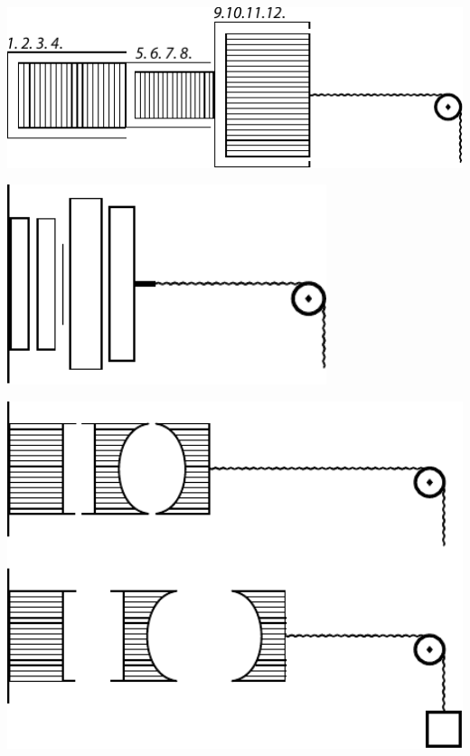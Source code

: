 \pend
\vspace{3em}
\pstart\noindent
\begin{minipage}[t]{0.4\textwidth}
\includegraphics[width=1\textwidth]{gesamttex/edit_VIII,3/images/LH_35_09_16_002-003_d7a.pdf}
\end{minipage}
\hspace*{4mm}
\begin{minipage}[t]{0.26\textwidth}
\includegraphics[width=0.7\textwidth]{gesamttex/edit_VIII,3/images/LH_35_09_16_002-003_d7b.pdf}
\end{minipage}
\hspace*{-6mm}
\begin{minipage}[t]{0.33\textwidth}
\includegraphics[width=1\textwidth]{gesamttex/edit_VIII,3/images/LH_35_09_16_002-003_d7c.pdf}
\end{minipage}
